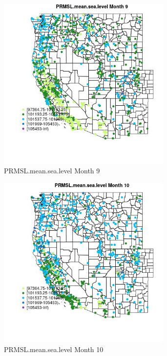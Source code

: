\begin{figure} 
\centering  
\includegraphics[width=0.77\textwidth]{Code_Outputs/Report_ML_input_PM25_Step4_part_f_de_duplicated_aves_prioritize_24hr_obswNAs_MapObsMo9PRMSLmeansealevel.jpg} 
\caption{\label{fig:Report_ML_input_PM25_Step4_part_f_de_duplicated_aves_prioritize_24hr_obswNAsMapObsMo9PRMSLmeansealevel}PRMSL.mean.sea.level Month 9} 
\end{figure} 
 

\begin{figure} 
\centering  
\includegraphics[width=0.77\textwidth]{Code_Outputs/Report_ML_input_PM25_Step4_part_f_de_duplicated_aves_prioritize_24hr_obswNAs_MapObsMo10PRMSLmeansealevel.jpg} 
\caption{\label{fig:Report_ML_input_PM25_Step4_part_f_de_duplicated_aves_prioritize_24hr_obswNAsMapObsMo10PRMSLmeansealevel}PRMSL.mean.sea.level Month 10} 
\end{figure} 
 

